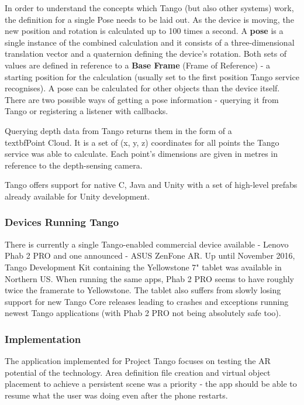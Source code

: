 \documentclass[12pt, a4paper]{article}
\begin{document}
In order to understand the concepts which Tango (but also other systems) work, the definition for a single Pose needs to be laid out. As the device is moving, the new position and rotation is calculated up to 100 times a second. A \textbf{pose} is a single instance of the combined calculation and it consists of a three-dimensional translation vector and a quaternion defining the device’s rotation. Both sets of values are defined in reference to a \textbf{Base Frame} (Frame of Reference) - a starting position for the calculation (usually set to the first position Tango service recognises). A pose can be calculated for other objects than the device itself. There are two possible ways of getting a pose information - querying it from Tango or registering a listener with callbacks.

Querying depth data from Tango returns them in the form of a \\textbf{Point Cloud}. It is a set of (x, y, z) coordinates for all points the Tango service was able to calculate. Each point’s dimensions are given in metres in reference to the depth-sensing camera.

Tango offers support for native C, Java and Unity with a set of high-level prefabs already available for Unity development.

\subsubsection{Devices Running Tango}

There is currently a single Tango-enabled commercial device available - Lenovo Phab 2 PRO and one announced - ASUS ZenFone AR. Up until November 2016, Tango Development Kit containing the Yellowstone 7" tablet was available in Northern US. When running the same apps, Phab 2 PRO seems to have roughly twice the framerate to Yellowstone. The tablet also suffers from slowly losing support for new Tango Core releases leading to crashes and exceptions running newest Tango applications (with Phab 2 PRO not being absolutely safe too).

\subsubsection{Implementation}
The application implemented for Project Tango focuses on testing the AR potential of the technology. Area definition file creation and virtual object placement to achieve a persistent scene was a priority - the app should be able to resume what the user was doing even after the phone restarts.
\end{document}

